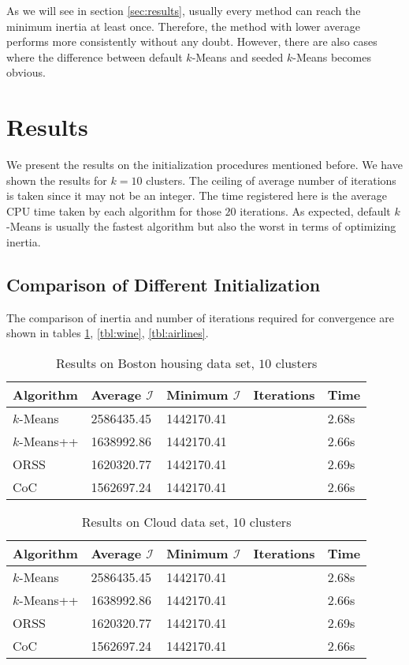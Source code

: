 \documentclass[twoside, 11pt]{article}
\newcommand{\I}{\mathcal{I}}
\begin{document}
	As we will see in section \eqref{sec:results}, usually every method can reach the minimum inertia at least once. Therefore, the method with lower average performs more consistently without any doubt. However, there are also cases where the difference between default $k$-Means and seeded $k$-Means becomes obvious.
	\section{Results}\label{sec:results}
	We present the results on the initialization procedures mentioned before. We have shown the results for $k=10$ clusters. The ceiling of average number of iterations is taken since it may not be an integer. The time registered here is the average CPU time taken by each algorithm for those $20$ iterations. As expected, default $k$-Means is usually the fastest algorithm but also the worst in terms of optimizing inertia.
	\subsection{Comparison of Different Initialization}
	The comparison of inertia and number of iterations required for convergence are shown in tables \ref{tbl:boston}, \ref{tbl:wine}, \ref{tbl:airlines}. 
		\begin{table}
			\begin{center}
				\begin{tabular}{|l|l|l|l|l|}
					\hline
					Algorithm & Average $\I$& Minimum $\I$& Iterations & Time\\\hline
					$k$-Means & 2586435.45& 1442170.41& & 2.68s\\\hline
					$k$-Means++ & 1638992.86& 1442170.41& & 2.66s\\\hline
					ORSS & 1620320.77& 1442170.41& & 2.69s\\\hline
					CoC & 1562697.24& 1442170.41& & 2.66s\\\hline
				\end{tabular}
			\caption{Results on Boston housing data set, $10$ clusters}
			\label{tbl:boston}
			\end{center}
		\end{table}
	
		\begin{table}
			\begin{center}
				\begin{tabular}{|l|l|l|l|l|}
					\hline
					Algorithm & Average $\I$& Minimum $\I$& Iterations & Time\\\hline
					$k$-Means & 2586435.45& 1442170.41& & 2.68s\\\hline
					$k$-Means++ & 1638992.86& 1442170.41& & 2.66s\\\hline
					ORSS & 1620320.77& 1442170.41& & 2.69s\\\hline
					CoC & 1562697.24& 1442170.41& & 2.66s\\\hline
				\end{tabular}
				\caption{Results on Cloud data set, $10$ clusters}
				\label{tbl:cloud}
			\end{center}
		\end{table}
	
\end{document}
